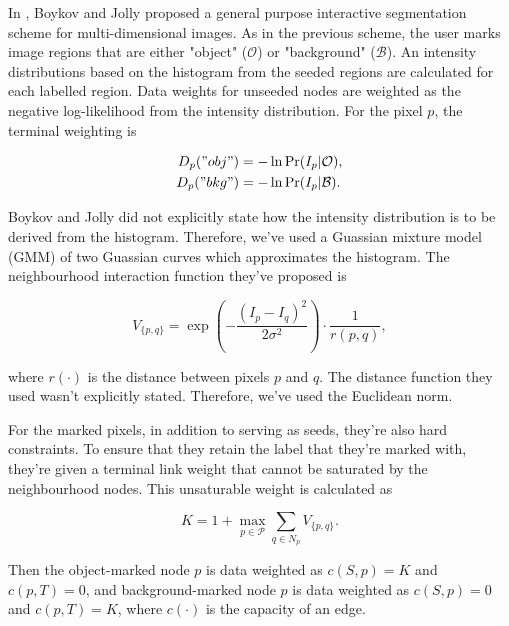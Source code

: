 \begin{definition}
	In \citep{Boykov2001_2}, Boykov and Jolly proposed a general purpose interactive segmentation scheme for multi-dimensional images. As in the previous scheme, the user marks image regions that are either "object" ($\mathcal{O}$) or "background" ($\mathcal{B}$). An intensity distributions based on the histogram from the seeded regions are calculated for each labelled region. Data weights for unseeded nodes are weighted as the negative log-likelihood from the intensity distribution. For the pixel $p$, the terminal weighting is

\begin{align}
	D_p("obj") &= -\ln\Pr(I_p|\mathcal{O}), \\
	D_p("bkg") &= -\ln\Pr(I_p|\mathcal{B}).
\end{align}

Boykov and Jolly did not explicitly state how the intensity distribution is to be derived from the histogram. Therefore, we've used a Guassian mixture model (GMM) of two Guassian curves which approximates the histogram. The neighbourhood interaction function they've proposed is

\begin{equation}
	V_{\{p,q\}} = \exp\left( -\frac{(I_p-I_q)^2}{2 \sigma^2}\right)\cdot\frac{1}{r(p,q)},
\end{equation}

where $r(\cdot)$ is the distance between pixels $p$ and $q$. The distance function they used wasn't explicitly stated. Therefore, we've used the Euclidean norm.

For the marked pixels, in addition to serving as seeds, they're also hard constraints. To ensure that they retain the label that they're marked with, they're given a terminal link weight that cannot be saturated by the neighbourhood nodes. This unsaturable weight is calculated as

\begin{equation}
	K = 1 + \max_{p \in \mathcal{P}}\sum_{q \in N_p}V_{\{p,q\}}.
	\label{eq:hardconstraintweight}
\end{equation}

Then the object-marked node $p$ is data weighted as $c(S,p)=K$ and $c(p,T)=0$, and background-marked node $p$ is data weighted as $c(S,p)=0$ and $c(p,T)=K$, where $c(\cdot)$ is the capacity of an edge.
\end{definition}


